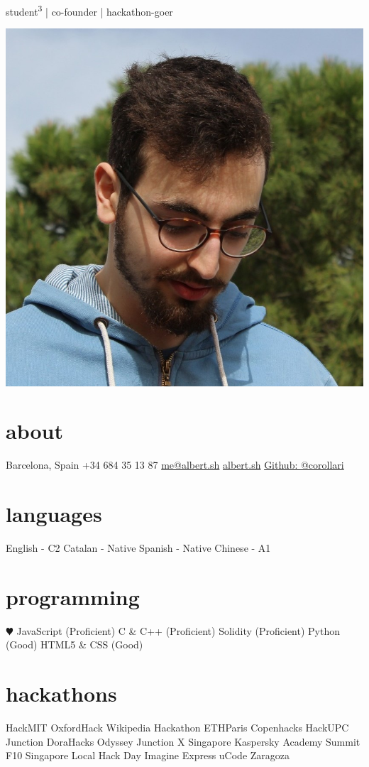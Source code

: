 \documentclass[]{friggeri-cv}
\begin{document}
       {student\textsuperscript{3} | co-founder | hackathon-goer}

\begin{aside}
  \includegraphics[width=\textwidth]{me.jpg}
  \section{about}
    Barcelona, Spain
    +34 684 35 13 87
    \href{mailto:me@albert.sh}{me@albert.sh}
    \href{https://albert.sh}{albert.sh}
    \href{https://github.com/corollari}{Github: @corollari}
  \section{languages}
    English - C2
    Catalan - Native
    Spanish - Native
    Chinese - A1
  \section{programming}
    {\color{red} $\varheartsuit$} JavaScript (Proficient)
    C \& C++ (Proficient)
    Solidity (Proficient)
    Python (Good)
    HTML5 \& CSS (Good)
  \section{hackathons}
HackMIT
OxfordHack
Wikipedia Hackathon
ETHParis
Copenhacks
HackUPC
Junction
DoraHacks
Odyssey
Junction X Singapore
Kaspersky Academy Summit
F10 Singapore
Local Hack Day
Imagine Express
uCode Zaragoza
\end{aside}
%
\end{document}
